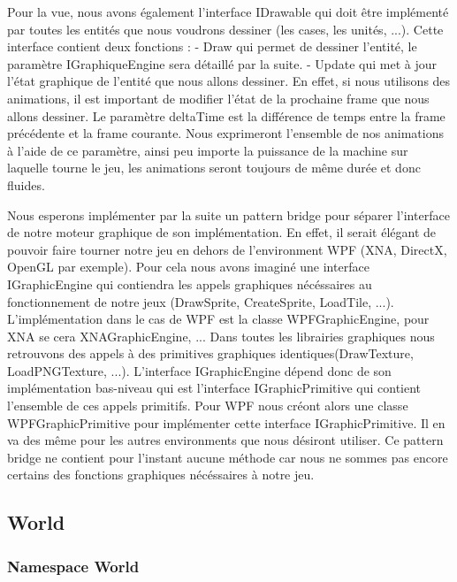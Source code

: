 		Pour la vue, nous avons également l'interface IDrawable qui doit être implémenté par toutes les entités que nous voudrons dessiner (les cases, les unités, ...). 
		Cette interface contient deux fonctions :
		- Draw qui permet de dessiner l'entité, le paramètre IGraphiqueEngine sera détaillé par la suite.
		- Update qui met à jour l'état graphique de l'entité que nous allons dessiner. En effet, si nous utilisons des animations, il est important de modifier l'état de la prochaine frame que nous allons dessiner.
		Le paramètre deltaTime est la différence de temps entre la frame précédente et la frame courante. Nous exprimeront l'ensemble de nos animations à l'aide de ce paramètre, ainsi peu importe la puissance de la machine
		sur laquelle tourne le jeu, les animations seront toujours de même durée et donc fluides.

			Nous esperons implémenter par la suite un pattern bridge pour séparer l'interface de notre moteur graphique de son implémentation. 
		En effet, il serait élégant de pouvoir faire tourner notre jeu en dehors de l'environment WPF (XNA, DirectX, OpenGL par exemple).
		Pour cela nous avons imaginé une interface IGraphicEngine qui contiendra les appels graphiques nécéssaires au fonctionnement de notre jeux (DrawSprite, CreateSprite, LoadTile, ...).
		L'implémentation dans le cas de WPF est la classe WPFGraphicEngine, pour XNA se cera XNAGraphicEngine, ...
		Dans toutes les librairies graphiques nous retrouvons des appels à des primitives graphiques identiques(DrawTexture, LoadPNGTexture, ...). 
			L'interface IGraphicEngine dépend donc de son implémentation bas-niveau qui est l'interface IGraphicPrimitive qui contient l'ensemble de ces appels primitifs.
		Pour WPF nous créont alors une classe WPFGraphicPrimitive pour implémenter cette interface IGraphicPrimitive. Il en va des même pour les autres environments que nous désiront utiliser.
		Ce pattern bridge ne contient pour l'instant aucune méthode car nous ne sommes pas encore certains des fonctions graphiques nécéssaires à notre jeu.

		
	\subsection{World}
		\subsubsection{Namespace World}
